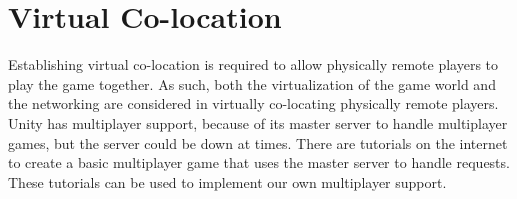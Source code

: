 \section{Virtual Co-location} \label{sec:virtualcolocation}
Establishing virtual co-location is required to allow physically remote players
		to play the game together. As such, both the virtualization of the game world and
		the networking are considered in virtually co-locating physically remote players.
		Unity has multiplayer support, because of its master server to handle multiplayer
		games, but the server could be down at times. There are tutorials on the internet
		to create a basic multiplayer game that uses the master server to handle requests.
		These tutorials can be used to implement our own multiplayer support.

